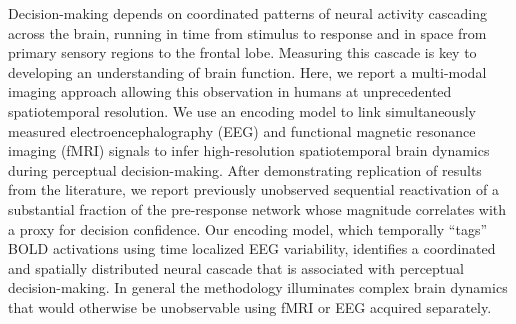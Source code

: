 Decision-making depends on coordinated patterns of neural activity cascading across the brain, running in time from stimulus to response and in space from primary sensory regions to the frontal lobe. Measuring this cascade is key to developing an understanding of brain function. Here, we report a multi-modal imaging approach allowing this observation in humans at unprecedented spatiotemporal resolution. We use an encoding model to link simultaneously measured electroencephalography (EEG) and functional magnetic resonance imaging (fMRI) signals to infer high-resolution spatiotemporal brain dynamics during perceptual decision-making. After demonstrating replication of results from the literature, we report previously unobserved sequential reactivation of a substantial fraction of the pre-response network whose magnitude correlates with a proxy for decision confidence. Our encoding model, which temporally “tags” BOLD activations using time localized EEG variability, identifies a coordinated and spatially distributed neural cascade that is associated with perceptual decision-making. In general the methodology illuminates complex brain dynamics that would otherwise be unobservable using fMRI or EEG acquired separately.